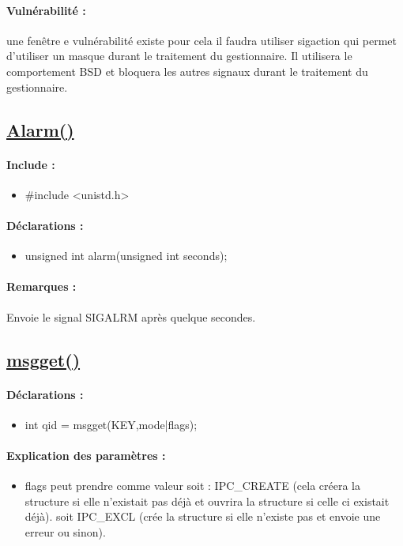 \documentclass{article}[12pt]
\begin{document}
\paragraph{Vulnérabilité : } une fenêtre e vulnérabilité existe pour cela il faudra utiliser sigaction qui permet d'utiliser un masque durant le traitement du gestionnaire. Il utilisera le comportement BSD et bloquera les autres signaux durant le traitement du gestionnaire.
\subsection{\href{http://jp.barralis.com/linux-man/man2/alarm.2.php}{Alarm()}}
\paragraph{Include : }
\begin{itemize}
	\item \#include <unistd.h>
\end{itemize}
\paragraph{Déclarations : }
\begin{itemize}
	\item unsigned int alarm(unsigned int seconds);
\end{itemize}
\paragraph{Remarques : }
Envoie le signal SIGALRM après quelque secondes.
\subsection{\href{http://jp.barralis.com/linux-man/man2/msgget.2.php}{msgget()}}
\paragraph{Déclarations : }
\begin{itemize}
	\item int qid = msgget(KEY,mode|flags);
\end{itemize}
\paragraph{Explication des paramètres : }
\begin{itemize}
	\item flags peut prendre comme valeur soit : IPC\_CREATE (cela créera la structure si elle n'existait pas déjà et ouvrira la structure si celle ci existait déjà). soit IPC\_EXCL (crée la structure si elle n'existe pas et envoie une erreur ou sinon).   
\end{itemize}
\end{document}
